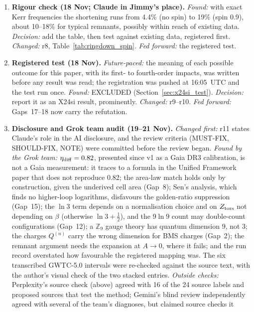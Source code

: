 \documentclass[11pt,a4paper]{article}
\begin{document}
\begin{enumerate}[leftmargin=*, label=\textbf{T\arabic*.}, itemsep=3pt]
    added as Fig.~\ref{fig:grace_run}. \emph{Fed forward:} a rigour check.
  \item \textbf{Rigour check (18 Nov; Claude in Jimmy's place).} \emph{Found:} with exact Kerr
    frequencies the shortening runs from 4.4\% (no spin) to 19\% (spin 0.9), about 10--18\%
    for typical remnants, possibly within reach of existing data. \emph{Decision:} add the
    table, then test against existing data, registered first. \emph{Changed:} r8,
    Table~\ref{tab:ringdown_spin}. \emph{Fed forward:} the registered test.
  \item \textbf{Registered test (18 Nov).} \emph{Future-paced:} the meaning of each possible
    outcome for this paper, with its first- to fourth-order impacts, was written before any
    result was read; the registration was pushed at 16:05~UTC and the test run once.
    \emph{Found:} EXCLUDED (Section~\ref{sec:x24si_test}). \emph{Decision:} report it as an
    X24si result, prominently. \emph{Changed:} r9--r10. \emph{Fed forward:} Gaps~17--18 now
    carry the refutation.
  \item \textbf{Disclosure and Grok team audit (19--21 Nov).} \emph{Changed first:} r11
    states Claude's role in the AI disclosure, and the review criteria (MUST-FIX, SHOULD-FIX,
    NOTE) were committed before the review began. \emph{Found by the Grok team:}
    $\eta_{\rm diff} = 0.82$, presented since v1 as a Gaia DR3 calibration, is not a Gaia
    measurement: it traces to a formula in the Unified Framework paper that does not reproduce
    0.82; the area-law match holds only by construction, given the underived cell area
    (Gap~8); Sen's analysis, which finds no higher-loop logarithms, disfavours the
    golden-ratio suppression (Gap~15); the $\ln 3$ term depends on a normalisation choice and
    on $Z_{\rm tors}$ not depending on $\beta$ (otherwise $\ln 3 + \frac12$), and the $9\ln 9$
    count may double-count configurations (Gap~12); a $\mathbb{Z}_9$ gauge theory has quantum
    dimension 9, not 3; the charges $Q^{(n)}$ carry the wrong dimension for BMS charges
    (Gap~2); the remnant argument needs the expansion at $A\to 0$, where it fails; and the run
    record overstated how favourable the registered mapping was. The six transcribed GWTC-5.0
    intervals were re-checked against the source text, with the author's visual check of the
    two stacked entries. \emph{Outside checks:} Perplexity's source check (above) agreed with
    16 of the 24 source labels and proposed sources that test the method; Gemini's blind review
    independently agreed with several of the team's diagnoses, but claimed source checks it

\end{enumerate}
\end{document}
